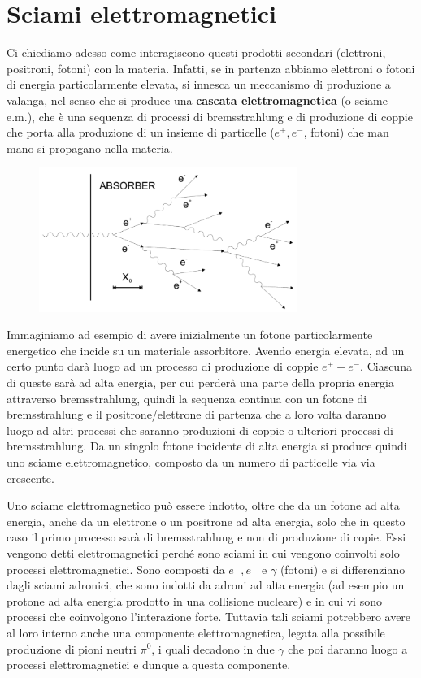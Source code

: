 \section{Sciami elettromagnetici}

Ci chiediamo adesso come interagiscono questi prodotti secondari (elettroni, positroni, fotoni) con la materia. Infatti, se in partenza abbiamo elettroni o fotoni di energia particolarmente elevata, si innesca un meccanismo di produzione a valanga, nel senso che si produce una \textbf{cascata elettromagnetica} (o sciame e.m.), che è una sequenza di processi di bremsstrahlung e di produzione di coppie che porta alla produzione di un insieme di particelle ($e^+, e^-$, fotoni) che man mano si propagano nella materia.

\begin{figure}[H]
    \centering
    \includegraphics[width=0.75\textwidth]{immagini/sciame_elettromagnetico.png}
\end{figure}

Immaginiamo ad esempio di avere inizialmente un fotone particolarmente energetico che incide su un materiale assorbitore. Avendo energia elevata, ad un certo punto darà luogo ad un processo di produzione di coppie $e^+ - e^-$. Ciascuna di queste sarà ad alta energia, per cui perderà una parte della propria energia attraverso bremsstrahlung, quindi la sequenza continua con un fotone di bremsstrahlung e il positrone/elettrone di partenza che a loro volta daranno luogo ad altri processi che saranno produzioni di coppie o ulteriori processi di bremsstrahlung. Da un singolo fotone incidente di alta energia si produce quindi uno sciame elettromagnetico, composto da un numero di particelle via via crescente.

Uno sciame elettromagnetico può essere indotto, oltre che da un fotone ad alta energia, anche da un elettrone o un positrone ad alta energia, solo che in questo caso il primo processo sarà di bremsstrahlung e non di produzione di copie. Essi vengono detti elettromagnetici perché sono sciami in cui vengono coinvolti solo processi elettromagnetici. Sono composti da $e^+,e^-$ e $\gamma$ (fotoni) e si differenziano dagli sciami adronici, che sono indotti da adroni ad alta energia (ad esempio un protone ad alta energia prodotto in una collisione nucleare) e in cui vi sono processi che coinvolgono l'interazione forte. Tuttavia tali sciami potrebbero avere al loro interno anche una componente elettromagnetica, legata alla possibile produzione di pioni neutri $\pi^0$, i quali decadono in due $\gamma$ che poi daranno luogo a processi elettromagnetici e dunque a questa componente.

